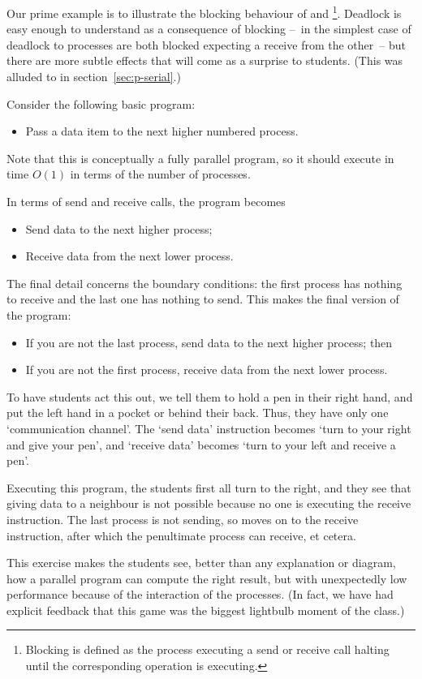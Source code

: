 Our prime example is to illustrate the blocking behaviour of
 and \footnote{Blocking is defined as the
  process executing a send or receive call halting until the
  corresponding operation is executing.}. Deadlock is easy enough to
understand as a consequence of blocking --~in the simplest case of
deadlock to processes are both blocked expecting a receive from the
other~-- but there are more subtle effects that will come as a
surprise to students. (This was alluded to in section~\ref{sec:p-serial}.)

Consider the following basic program:
\begin{itemize}
\item Pass a data item to the next higher numbered process.
\end{itemize}
Note that this is conceptually a fully parallel program, so it should
execute in time $O(1)$ in terms of the number of processes.

In terms of send and receive calls, the program becomes 
\begin{itemize}
\item Send data to the next higher process;
\item Receive data from the next lower process.
\end{itemize}
The final detail concerns the boundary conditions: the first process
has nothing to receive and the last one has nothing to send. This
makes the final version of the program:
\begin{itemize}
\item If you are not the last process, send data to the next higher
  process; then
\item If you are not the first process, receive data from the next
  lower process.
\end{itemize}
To have students act this out, we tell them to hold a pen in their
right hand, and put the left hand in a pocket or behind their
back. Thus, they have only one `communication channel'. The `send
data' instruction becomes `turn to your right and give your pen', and
`receive data' becomes `turn to your left and receive a pen'.

Executing this program, the students first all turn to the right, and
they see that giving data to a neighbour is not possible because no
one is executing the receive instruction. The last process is not
sending, so moves on to the receive instruction, after which the
penultimate process can receive, et cetera.

This exercise makes the students see, better than any explanation or
diagram, how a parallel program can compute the right result, but with
unexpectedly low performance because of the interaction of the processes.
(In fact, we have had explicit feedback that this game was
the biggest lightbulb moment of the class.)

